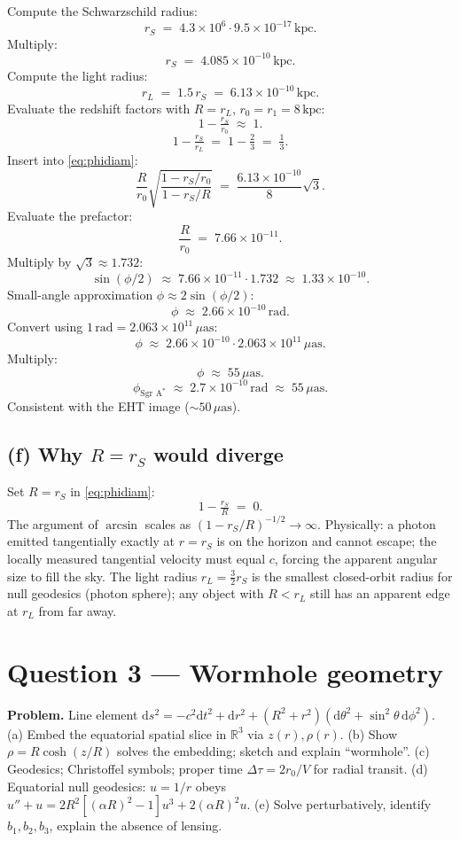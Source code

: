 \documentclass[11pt]{article}
\newcommand{\de}{\mathrm{d}}
\begin{document}
Compute the Schwarzschild radius:
\[
r_S \;=\; 4.3\times 10^6 \cdot 9.5\times 10^{-17}\,\text{kpc}.
\]
Multiply:
\[
r_S \;=\; 4.085\times 10^{-10}\,\text{kpc}.
\]
Compute the light radius:
\[
r_L \;=\; 1.5\,r_S \;=\; 6.13\times 10^{-10}\,\text{kpc}.
\]
Evaluate the redshift factors with $R=r_L$, $r_0=r_1=8\,\text{kpc}$:
\[
1-\tfrac{r_S}{r_0} \;\approx\; 1.
\]
\[
1-\tfrac{r_S}{r_L} \;=\; 1-\tfrac{2}{3} \;=\; \tfrac13.
\]
Insert into \eqref{eq:phidiam}:
\[
\frac{R}{r_0}\sqrt{\frac{1-r_S/r_0}{1-r_S/R}} \;=\; \frac{6.13\times 10^{-10}}{8}\sqrt{3}.
\]
Evaluate the prefactor:
\[
\frac{R}{r_0} \;=\; 7.66\times 10^{-11}.
\]
Multiply by $\sqrt{3}\approx 1.732$:
\[
\sin(\phi/2) \;\approx\; 7.66\times 10^{-11}\cdot 1.732 \;\approx\; 1.33\times 10^{-10}.
\]
Small-angle approximation $\phi\approx 2\sin(\phi/2)$:
\[
\phi \;\approx\; 2.66\times 10^{-10}\,\text{rad}.
\]
Convert using $1\,\text{rad}=2.063\times 10^{11}\,\mu\text{as}$:
\[
\phi \;\approx\; 2.66\times 10^{-10}\cdot 2.063\times 10^{11}\,\mu\text{as}.
\]
Multiply:
\[
\phi \;\approx\; 55\,\mu\text{as}.
\]
\begin{equation}
\boxed{\;\phi_{\text{Sgr A}^*} \;\approx\; 2.7\times 10^{-10}\,\text{rad} \;\approx\; 55\,\mu\text{as}.\;}
\label{eq:sgra}
\end{equation}
Consistent with the EHT image ($\sim 50\,\mu\text{as}$).

\subsection*{(f) Why $R=r_S$ would diverge}

Set $R=r_S$ in \eqref{eq:phidiam}:
\[
1-\tfrac{r_S}{R} \;=\; 0.
\]
The argument of $\arcsin$ scales as $(1-r_S/R)^{-1/2}\to\infty$. Physically: a photon emitted tangentially exactly at $r=r_S$ is on the horizon and cannot escape; the locally measured tangential velocity must equal $c$, forcing the apparent angular size to fill the sky. The light radius $r_L=\tfrac32 r_S$ is the smallest closed-orbit radius for null geodesics (photon sphere); any object with $R<r_L$ still has an apparent edge at $r_L$ from far away.

\section*{Question 3 --- Wormhole geometry}

\textbf{Problem.} Line element $\de s^2=-c^2\de t^2+\de r^2+(R^2+r^2)(\de\theta^2+\sin^2\theta\,\de\phi^2)$. (a) Embed the equatorial spatial slice in $\mathbb R^3$ via $z(r),\rho(r)$. (b) Show $\rho=R\cosh(z/R)$ solves the embedding; sketch and explain ``wormhole''. (c) Geodesics; Christoffel symbols; proper time $\Delta\tau=2r_0/V$ for radial transit. (d) Equatorial null geodesics: $u=1/r$ obeys $u''+u=2R^2[(\alpha R)^2-1]u^3+2(\alpha R)^2 u$. (e) Solve perturbatively, identify $b_1,b_2,b_3$, explain the absence of lensing.
\end{document}
